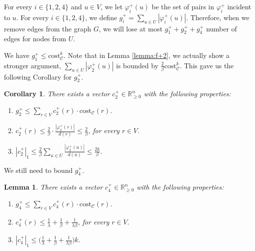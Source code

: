 \documentclass[11pt]{article}
\newcommand{\R}{\mathbb{R}}
\newcommand{\cost}{\mathrm{cost}}
\newtheorem{lemma}[theorem]{Lemma}
\newtheorem{coro}[theorem]{Corollary}
\newcommand{\calC}{{\mathcal{C}}}
\begin{document}
\begin{CJK*}{UTF8}{gbsn}
For every $i \in \{1, 2, 4\}$ and $u \in V$, we let $\varphi^+_i(u)$ be the set of pairs in $\varphi^+_i$ incident to $u$. 
For every $i \in \{1, 2, 4\}$,  we define $g^+_i = \sum_{u \in U}|\varphi^+_i(u)|$. Therefore, when we remove edges from the graph $G$, we will lose at most $ g^+_1 + g^+_2 + g^+_4$ number of edges for nodes from $U$. 

We have $g^+_1 \leq \cost^k_{\mathcal{C}}$. Note that in Lemma \ref{lemma:f+2}, we actually show a stronger argument, $\sum_{u \in U}|\varphi^+_2(u)|$ is bounded by $\frac{2}{\beta}\cost^k_{\mathcal{C}}$. This gave us the following Corollary for $g^+_2$. 

\begin{coro}
    \label{coro:g+2}
    There exists a vector $c^+_2 \in \R_{\geq 0}^{n}$ with the following properties:
    \begin{enumerate}[label=(\ref{coro:g+2}\alph*)]
        \item \label{property:g+2-cost} $g^+_2 \leq \sum_{r \in V}c^+_2(r)\cdot \cost_\calC(r)$.
        \item \label{property:g+2-c+2-infty} $c^+_2(r) \leq \frac{2}{\beta} \cdot \frac{|\varphi^+_2(r)|}{d(r)} \leq \frac{2}{\beta}$, for every $r \in V$.
        \item \label{property:g+2-c+2-1} $|c^+_2|_1 \leq \frac2\beta\sum_{u \in U}\frac{|\varphi^+_2(u)|}{d(u)} \leq \frac{2k}{\beta}$.
    \end{enumerate}
\end{coro}

We still need to bound $g^+_4$.

\begin{lemma}
    \label{lemma:g+3}
    There exists a vector $c^+_4 \in \R_{\geq 0}^{n}$ with the following properties:
    \begin{enumerate}[label=(\ref{lemma:g+3}\alph*)]
        \item \label{property:g+3-cost} $g^+_4 \leq \sum_{r \in V}c^+_4(r)\cdot \cost_\calC(r)$.
        \item \label{property:g+3-c+3-infty} $c^+_4(r) \leq  \frac{1}{\lambda} + \frac{1}{\beta} + \frac{1}{\lambda\beta} $, for every $r \in V$.
        \item \label{property:g+3-c+3-1} $|c^+_4|_1 \leq \big( \frac{1}{\lambda} + \frac{1}{\beta} + \frac{1}{\lambda\beta} \big)k$.
    \end{enumerate}
\end{lemma}









\end{CJK*}
\end{document}
